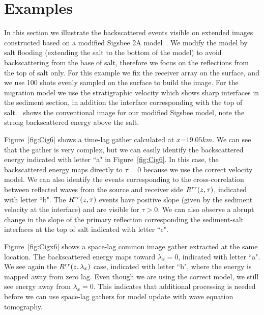 


\section{Examples}

In this section we illustrate the backscattered events visible on extended images constructed based on a modified Sigsbee 2A model~\citep{Sigsbee}.
 We modify the model by salt flooding (extending the salt to the bottom
of the model) to avoid backscattering from the base 
of salt, therefore we focus on the reflections from the top of salt only. For this example we fix the receiver array on 
the surface, and we use 100 shots evenly sampled on the surface to build 
the image. For the migration model we use the stratigraphic
velocity which shows sharp interfaces in the sediment section, in addition the interface corresponding with the top of salt.~
 shows the conventional image for our modified Sigsbee model, note the strong backscattered
energy above the salt.

Figure~\ref{fig:Cig6} shows a time-lag gather calculated at $x$=$19.05km$.
We can see that the gather is very complex, but we can easily identify the backscattered energy indicated with letter ``a" in Figure~\ref{fig:Cig6}.
 In this case, the backscattered energy maps directly to $\tau=0$ because we use the correct velocity model.
We can also identify the events corresponding to the cross-correlation between reflected waves from the source and receiver side $R^{rr}(z,\tau)$, indicated
with letter ``b". The $R^{rr}(z,\tau)$ events have positive slope (given by the sediment velocity at the interface) and are 
visible for $\tau>0$. We can also observe a abrupt change
in the slope of the primary reflection corresponding the sediment-salt interfaces at the top of salt indicated with letter ``c".

Figure~\ref{fig:Cigx6} shows a space-lag common image gather extracted at the same location. The backscattered energy maps toward $\lambda_x=0$, indicated with 
letter ``a". We see again the $R^{rr}(z,\lambda_x)$ case, indicated with letter ``b", where the energy is mapped away from zero lag.  
Even though we are using the correct model, we still see energy away from $\lambda_x=0$. This indicates that additional processing is needed before 
we can use space-lag gathers for model update with wave equation tomography.


